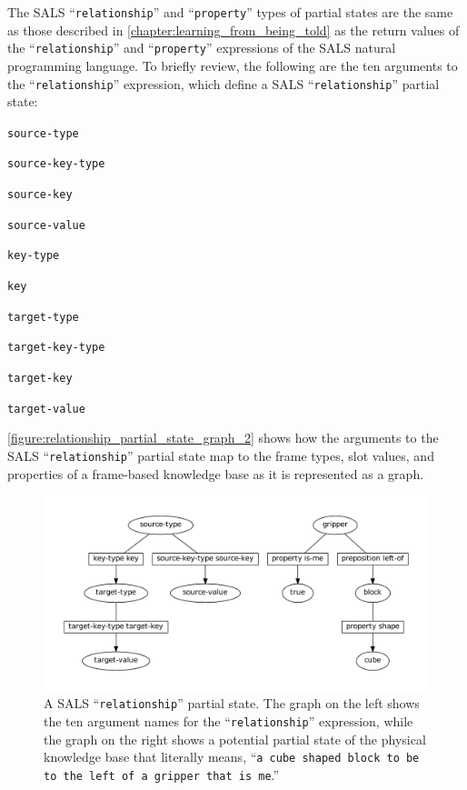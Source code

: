 The SALS ``{\tt{relationship}}'' and ``{\tt{property}}'' types of
partial states are the same as those described in
{\mbox{\autoref{chapter:learning_from_being_told}}} as the return
values of the ``{\tt{relationship}}'' and ``{\tt{property}}''
expressions of the SALS natural programming language.  To briefly
review, the following are the ten arguments to the
``{\tt{relationship}}'' expression, which define a SALS
``{\tt{relationship}}'' partial state:
\begin{packed_enumerate}
\item{{\tt{source-type}}}
\item{{\tt{source-key-type}}}
\item{{\tt{source-key}}}
\item{{\tt{source-value}}}
\item{{\tt{key-type}}}
\item{{\tt{key}}}
\item{{\tt{target-type}}}
\item{{\tt{target-key-type}}}
\item{{\tt{target-key}}}
\item{{\tt{target-value}}}
\end{packed_enumerate}
{\mbox{\autoref{figure:relationship_partial_state_graph_2}}} shows how
the arguments to the SALS ``{\tt{relationship}}'' partial state map to
the frame types, slot values, and properties of a frame-based
knowledge base as it is represented as a graph.
\begin{figure}
\centering
\includegraphics[width=12cm]{gfx/relationship_partial_state_graph}
\caption[A SALS ``{\tt{relationship}}'' partial state.]{A SALS
  ``{\tt{relationship}}'' partial state.  The graph on the left shows
  the ten argument names for the ``{\tt{relationship}}'' expression,
  while the graph on the right shows a potential partial state of the
  physical knowledge base that literally means, ``{\tt{a cube shaped
      block to be to the left of a gripper that is me}}.''}
\label{figure:relationship_partial_state_graph_2}
\end{figure}
